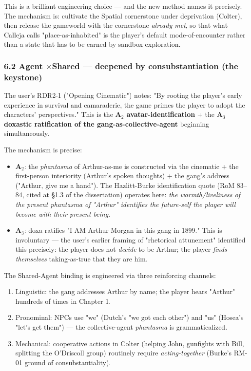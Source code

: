 \documentclass[11pt]{report}
\begin{document}
This is a brilliant engineering choice — and the new method names it precisely. The mechanism is: cultivate the Spatial cornerstone under deprivation (Colter), then release the gameworld with the cornerstone \textit{already met}, so that what Calleja calls "place-as-inhabited" is the player's default mode-of-encounter rather than a state that has to be earned by sandbox exploration.


\subsubsection{6.2 Agent $\times$\allowbreak  Shared — deepened by consubstantiation (the keystone)}


The user's RDR2-1 ("Opening Cinematic") notes: "By rooting the player's early experience in survival and camaraderie, the game primes the player to adopt the characters' perspectives." This is the \textbf{A$_2$ avatar-identification} + the \textbf{A$_3$ doxastic ratification of the gang-as-collective-agent} beginning simultaneously.


The mechanism is precise:


\begin{itemize}
\item \textbf{A$_2$}: the \textit{phantasma} of Arthur-as-me is constructed via the cinematic + the first-person interiority (Arthur's spoken thoughts) + the gang's address ("Arthur, give me a hand"). The Hazlitt-Burke identification quote (RoM 83–84, cited at §1.3 of the dissertation) operates here: \textit{the warmth/liveliness of the present phantasma of "Arthur" identifies the future-self the player will become with their present being}.
\item \textbf{A$_3$}: doxa ratifies "I AM Arthur Morgan in this gang in 1899." This is involuntary — the user's earlier framing of "rhetorical attunement" identified this precisely: the player does not \textit{decide} to be Arthur; the player \textit{finds themselves} taking-as-true that they are him.
\end{itemize}


The Shared-Agent binding is engineered via three reinforcing channels:

\begin{enumerate}
\item Linguistic: the gang addresses Arthur by name; the player hears "Arthur" hundreds of times in Chapter 1.
\item Pronominal: NPCs use "we" (Dutch's "we got each other") and "us" (Hosea's "let's get them") — the collective-agent \textit{phantasma} is grammaticalized.
\item Mechanical: cooperative actions in Colter (helping John, gunfights with Bill, splitting the O'Driscoll group) routinely require \textit{acting-together} (Burke's RM-01 ground of consubstantiality).
\end{enumerate}
\end{document}
